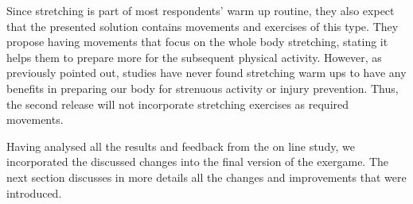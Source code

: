 \begin{enumerate}
Since stretching is part of most respondents' warm up routine, they also expect that the presented solution contains movements and exercises of this type. They propose having movements that focus on the whole body stretching, stating it helps them to prepare more for the subsequent physical activity. However, as previously pointed out, studies have never found stretching warm ups to have any benefits in preparing our body for strenuous activity or injury prevention. Thus, the second release will not incorporate stretching exercises as required movements. %
\end{enumerate}
Having analysed all the results and feedback from the on line study, we incorporated the discussed changes into the final version of the exergame. The next section discusses in more details all the changes and improvements that were introduced. 